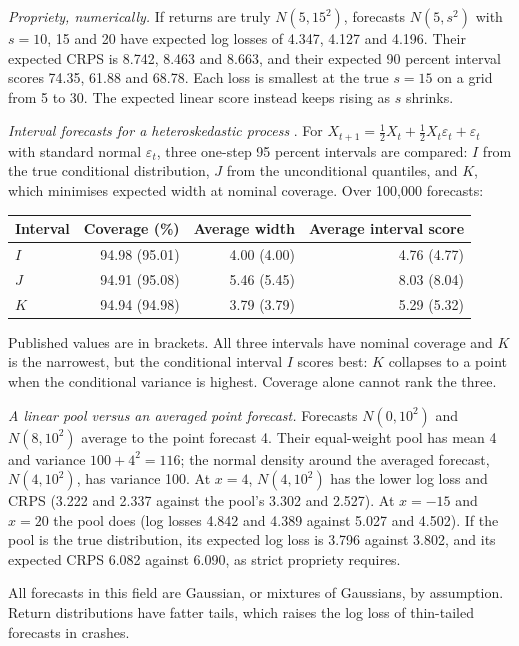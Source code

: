 \begin{qfmethod}
\emph{Propriety, numerically.} If returns are truly $N(5,15^2)$, forecasts $N(5,s^2)$ with $s=10$, 15 and 20 have expected log losses of 4.347, 4.127 and 4.196. Their expected CRPS is 8.742, 8.463 and 8.663, and their expected 90 percent interval scores 74.35, 61.88 and 68.78. Each loss is smallest at the true $s=15$ on a grid from 5 to 30. The expected linear score instead keeps rising as $s$ shrinks.

\emph{Interval forecasts for a heteroskedastic process} \citep[eqs.~(44)--(47), Table~2, p.~371]{wide-gneiting-raftery}. For $X_{t+1}=\tfrac12X_t+\tfrac12X_t\varepsilon_t+\varepsilon_t$ with standard normal $\varepsilon_t$, three one-step 95 percent intervals are compared: $I$ from the true conditional distribution, $J$ from the unconditional quantiles, and $K$, which minimises expected width at nominal coverage. Over 100,000 forecasts:
\begin{center}\small
\begin{tabular}{@{}lrrr@{}}
\toprule
Interval & Coverage (\%) & Average width & Average interval score \\
\midrule
$I$ & 94.98 (95.01) & 4.00 (4.00) & 4.76 (4.77) \\
$J$ & 94.91 (95.08) & 5.46 (5.45) & 8.03 (8.04) \\
$K$ & 94.94 (94.98) & 3.79 (3.79) & 5.29 (5.32) \\
\bottomrule
\end{tabular}
\end{center}
Published values are in brackets. All three intervals have nominal coverage and $K$ is the narrowest, but the conditional interval $I$ scores best: $K$ collapses to a point when the conditional variance is highest. Coverage alone cannot rank the three.

\emph{A linear pool versus an averaged point forecast.} Forecasts $N(0,10^2)$ and $N(8,10^2)$ average to the point forecast 4. Their equal-weight pool has mean 4 and variance $100+4^2=116$; the normal density around the averaged forecast, $N(4,10^2)$, has variance 100. At $x=4$, $N(4,10^2)$ has the lower log loss and CRPS (3.222 and 2.337 against the pool's 3.302 and 2.527). At $x=-15$ and $x=20$ the pool does (log losses 4.842 and 4.389 against 5.027 and 4.502). If the pool is the true distribution, its expected log loss is 3.796 against 3.802, and its expected CRPS 6.082 against 6.090, as strict propriety requires.

All forecasts in this field are Gaussian, or mixtures of Gaussians, by assumption. Return distributions have fatter tails, which raises the log loss of thin-tailed forecasts in crashes.


\end{qfmethod}

